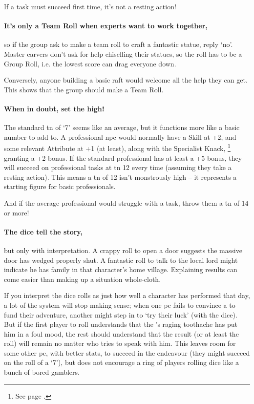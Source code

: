 \begin{multicols}{2}
If a task must succeed first time, it's not a resting action!

\paragraph{It's only a Team Roll when experts want to work together,} so if the group ask to make a team roll to craft a fantastic statue, reply `no'.
Master carvers don't ask for help chiselling their statues, so the roll has to be a Group Roll, i.e. the lowest score can drag everyone down.

Conversely, anyone building a basic raft would welcome all the help they can get.
This shows that the group should make a Team Roll.

\paragraph{When in doubt, set the  high!}
The standard \gls{tn} of `7' seems like an average, but it functions more like a basic number to add to.
A professional \gls{npc} would normally have a Skill at +2, and some relevant Attribute at +1 (at least), along with the Specialist Knack,%
\footnote{See page \pageref{specialist}.}
granting a +2 bonus.
If the standard professional has at least a +5 bonus, they will succeed on professional tasks at \gls{tn} 12 every time (assuming they take a resting action).
This means a \gls{tn} of 12 isn't monstrously high -- it represents a starting figure for basic professionals.

And if the average professional would struggle with a task, throw them a \gls{tn} of 14 or more!

\paragraph{The dice tell the story,} but only with interpretation.
A crappy roll to open a door suggests the massive door has wedged properly shut.
A fantastic roll to talk to the local lord might indicate he has family in that character's home village.
Explaining results can come easier than making up a situation whole-cloth.

If you interpret the dice rolls as just how well a character has performed that day, a lot of the system will stop making sense; when one \gls{pc} fails to convince a \iftoggle{aif}{town master}{baron} to fund their \gls{adventure}, another might step in to `try their luck' (with the dice).
But if the first player to roll understands that the \iftoggle{aif}{town master}{baron}'s raging toothache has put him in a foul mood, the rest should understand that the result (or at least the roll) will remain no matter who tries to speak with him.
This leaves room for some other \gls{pc}, with better stats, to succeed in the endeavour (they might succeed on the roll of a `7'), but does not encourage a ring of players rolling dice like a bunch of bored gamblers.


\end{multicols}
